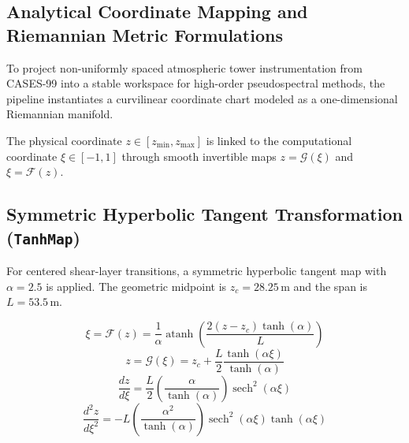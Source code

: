 
\subsection{Analytical Coordinate Mapping and Riemannian Metric Formulations}
To project non-uniformly spaced atmospheric tower instrumentation from CASES-99 into a stable workspace for high-order pseudospectral methods, the pipeline instantiates a curvilinear coordinate chart modeled as a one-dimensional Riemannian manifold.

The physical coordinate $z \in [z_{\min}, z_{\max}]$ is linked to the computational coordinate $\xi \in [-1, 1]$ through smooth invertible maps $z = \mathcal{G}(\xi)$ and $\xi = \mathcal{F}(z)$.

\subsection{Symmetric Hyperbolic Tangent Transformation (\texttt{TanhMap})}
For centered shear-layer transitions, a symmetric hyperbolic tangent map with $\alpha = 2.5$ is applied.
The geometric midpoint is $z_c = 28.25\,\mathrm{m}$ and the span is $L = 53.5\,\mathrm{m}$.

\begin{equation}
    \xi = \mathcal{F}(z) = \frac{1}{\alpha} \operatorname{atanh}\left( \frac{2(z - z_c)\tanh(\alpha)}{L} \right)
\end{equation}
\begin{equation}
    z = \mathcal{G}(\xi) = z_c + \frac{L}{2} \frac{\tanh(\alpha \xi)}{\tanh(\alpha)}
\end{equation}
\begin{equation}
    \frac{dz}{d\xi} = \frac{L}{2} \left( \frac{\alpha}{\tanh(\alpha)} \right) \operatorname{sech}^2(\alpha \xi)
\end{equation}
\begin{equation}
    \frac{d^2z}{d\xi^2} = -L \left( \frac{\alpha^2}{\tanh(\alpha)} \right) \operatorname{sech}^2(\alpha \xi)\tanh(\alpha \xi)
\end{equation}


